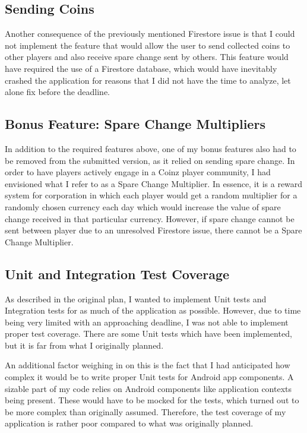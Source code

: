 \documentclass[11pt,a4paper,notitlepage]{article}
\begin{document}
\subsection{Sending Coins}

    Another consequence of the previously mentioned Firestore issue is that I could not implement the feature that would allow the user to send collected coins to other players and also receive spare change sent by others. This feature would have required the use of a Firestore database, which would have inevitably crashed the application for reasons that I did not have the time to analyze, let alone fix before the deadline.

\subsection{Bonus Feature: Spare Change Multipliers}

    In addition to the required features above, one of my bonus features also had to be removed from the submitted version, as it relied on sending spare change. In order to have players actively engage in a Coinz player community, I had envisioned what I refer to as a Spare Change Multiplier. In essence, it is a reward system for corporation in which each player would get a random multiplier for a randomly chosen currency each day which would increase the value of spare change received in that particular currency. However, if spare change cannot be sent between player due to an unresolved Firestore issue, there cannot be a Spare Change Multiplier.

\subsection{Unit and Integration Test Coverage}

    As described in the original plan, I wanted to implement Unit tests and Integration tests for as much of the application as possible. However, due to time being very limited with an approaching deadline, I was not able to implement proper test coverage. There are some Unit tests which have been implemented, but it is far from what I originally planned.

    An additional factor weighing in on this is the fact that I had anticipated how complex it would be to write proper Unit tests for Android app components. A sizable part of my code relies on Android components like application contexts being present. These would have to be mocked for the tests, which turned out to be more complex than originally assumed. Therefore, the test coverage of my application is rather poor compared to what was originally planned.
\end{document}
